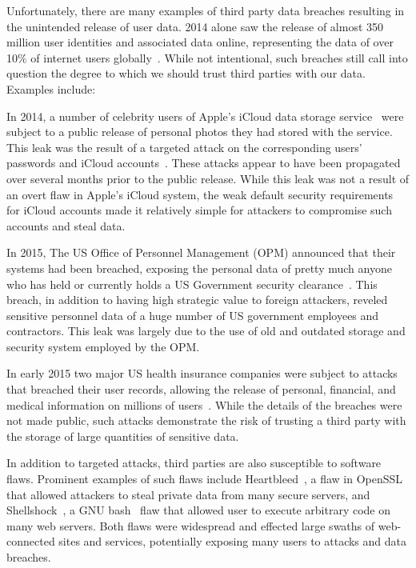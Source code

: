 Unfortunately, there are many examples of third party data breaches
resulting in the unintended release of user data. 2014 alone saw the
release of almost 350 million user identities and associated data
online, representing the data of over 10\% of internet users
globally~\cite{symanteccorporation2015}. While not intentional, such
breaches still call into question the degree to which we should trust
third parties with our data. Examples include:

\begin{packed_desc}
\item[Apple iCloud Celebrity Photo Leak:] In 2014, a number of
  celebrity users of Apple's iCloud data storage
  service~\cite{apple-icloud} were subject to a public release of
  personal photos they had stored with the service. This leak was the
  result of a targeted attack on the corresponding users' passwords
  and iCloud accounts~\cite{apple-icloudleak}. These attacks appear to
  have been propagated over several months prior to the public
  release. While this leak was not a result of an overt flaw in
  Apple's iCloud system, the weak default security requirements for
  iCloud accounts made it relatively simple for attackers to
  compromise such accounts and steal data.
\item[Office of Personnel Management Breach:] In 2015, The US Office
  of Personnel Management (OPM) announced that their systems had been
  breached, exposing the personal data of pretty much anyone who has
  held or currently holds a US Government security
  clearance~\cite{ars-opmhack, opm-cybersecurityincidents}. This
  breach, in addition to having high strategic value to foreign
  attackers, reveled sensitive personnel data of a huge number of US
  government employees and contractors. This leak was largely due to
  the use of old and outdated storage and security system employed by
  the OPM.
\item[Anthem and Premera Blue Cross Breaches:] In early 2015 two major
  US health insurance companies were subject to attacks that breached
  their user records, allowing the release of personal, financial, and
  medical information on millions of users~\cite{krebs-anthem,
    krebs-premera}. While the details of the breaches were not made
  public, such attacks demonstrate the risk of trusting a third party
  with the storage of large quantities of sensitive data.
\item[Heartbleed, Shellshock, Etc:] In addition to targeted attacks,
  third parties are also susceptible to software flaws. Prominent
  examples of such flaws include Heartbleed~\cite{heartbleed}, a flaw
  in OpenSSL~\cite{openssl} that allowed attackers to steal private
  data from many secure servers, and
  Shellshock~\cite{symantec-shellshock}, a GNU bash~\cite{gnu-bash}
  flaw that allowed user to execute arbitrary code on many web
  servers. Both flaws were widespread and effected large swaths of
  web-connected sites and services, potentially exposing many users to
  attacks and data breaches.
\end{packed_desc}

